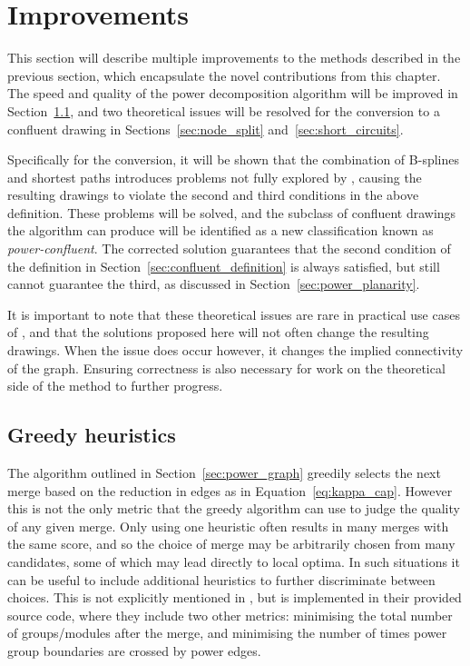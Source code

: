 \section{Improvements}
This section will describe multiple improvements to the methods described in the previous section, which encapsulate the novel contributions from this chapter. The speed and quality of the power decomposition algorithm will be improved in Section~\ref{sec:greedy_heuristics}, and two theoretical issues will be resolved for the conversion to a confluent drawing in Sections~\ref{sec:node_split} and~\ref{sec:short_circuits}.

Specifically for the conversion, it will be shown that the combination of B-splines and shortest paths introduces problems not fully explored by \citet{Bach2017}, causing the resulting drawings to violate the second and third conditions in the above definition. These problems will be solved, and the subclass of confluent drawings the algorithm can produce will be identified as a new classification known as \emph{power-confluent}. The corrected solution guarantees that the second condition of the definition in Section~\ref{sec:confluent_definition} is always satisfied, but still cannot guarantee the third, as discussed in Section~\ref{sec:power_planarity}.

It is important to note that these theoretical issues are rare in practical use cases of \citet{Bach2017}, and that the solutions proposed here will not often change the resulting drawings. When the issue does occur however, it changes the implied connectivity of the graph. Ensuring correctness is also necessary for work on the theoretical side of the method to further progress.

\subsection{Greedy heuristics}
\label{sec:greedy_heuristics}
The algorithm outlined in Section~\ref{sec:power_graph} greedily selects the next merge based on the reduction in edges as in Equation~\eqref{eq:kappa_cap}. However this is not the only metric that the greedy algorithm can use to judge the quality of any given merge.
Only using one heuristic often results in many merges with the same score, and so the choice of merge may be arbitrarily chosen from many candidates, some of which may lead directly to local optima. In such situations it can be useful to include additional heuristics to further discriminate between choices.
This is not explicitly mentioned in \citet{Dwyer2014}, but is implemented in their provided source code, where they include two other metrics: minimising the total number of groups/modules after the merge, and minimising the number of times power group boundaries are crossed by power edges.

